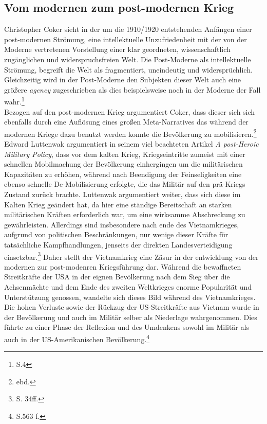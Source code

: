\documentclass[11pt,a4paper,oneside,numbers=noenddot,bibliography=totocnumbered,DIV=13]{scrartcl}
\begin{document}
\subsection{Vom modernen zum post-modernen Krieg}
Christopher Coker sieht in der um die 1910/1920 entstehenden Anfängen einer post-modernen  Strömung, eine intellektuelle Unzufriedenheit mit der von der Moderne vertretenen Vorstellung einer klar geordneten, wissenschaftlich zugänglichen und widerspruchsfreien Welt. Die Post-Moderne als intellektuelle Strömung, begreift die Welt als fragmentiert, uneindeutig und widersprüchlich. Gleichzeitig wird in der Post-Moderne den Subjekten dieser Welt auch eine größere \textit{agency} zugeschrieben als dies beispielsweise noch in der Moderne der Fall wahr.\footnote{\cite{coker_collision_2012} S.4}\\
Bezogen auf den post-modernen Krieg argumentiert Coker, dass dieser sich sich ebenfalls durch eine Auflösung eines großen Meta-Narratives das während der modernen Kriege dazu benutzt werden konnte die Bevölkerung zu mobilisieren.\footnote{ebd.}\\
Edward Luttenwak argumentiert in seinem viel beachteten Artikel \textit{A post-Heroic Military Policy}, dass vor dem kalten Krieg, Kriegseintritte zumeist mit einer schnellen Mobilmachung der Bevölkerung einhergingen um die militärischen Kapazitäten zu erhöhen, während nach Beendigung der Feinseligkeiten eine ebenso schnelle De-Mobilisierung erfolgte, die das Militär auf den prä-Kriegs Zustand zurück brachte. Luttenwak argumentiert weiter, dass sich diese im Kalten Krieg geändert hat, da hier eine ständige Bereitschaft an starken militärischen Kräften erforderlich war, um eine wirksamme Abschreckung zu gewährleisten. Allerdings sind insbesondere nach ende des Vietnamkrieges, aufgrund von politischen Beschränkungen, nur wenige dieser Kräfte für tatsächliche Kampfhandlungen, jenseits der direkten Landesverteidigung einsetzbar.\footnote{\cite{Luttwak1996} S. 34ff.}  
Daher stellt der Vietnamkrieg eine Zäsur in der entwicklung von der modernen zur post-modenren Kriegsführung dar. Während die bewaffneten Streitkräfte der USA in der eignen Bevölkerung nach dem Sieg über die Achsenmächte und dem Ende des zweiten Weltkrieges enorme Popularität und Unterstützung genossen, wandelte sich dieses Bild während des Vietnamkrieges. Die hohen Verluste sowie der Rückzug der US-Streitkräfte aus Vietnam wurde in der Bevölkerung und auch im Militär selber als Niederlage wahrgenommen. Dies führte zu einer Phase der Reflexion und des Umdenkens sowohl im Militär als auch in der US-Amerikanischen Bevölkerung.\footnote{\cite{olson_war_2007} S.563 f.}\\
\end{document}
